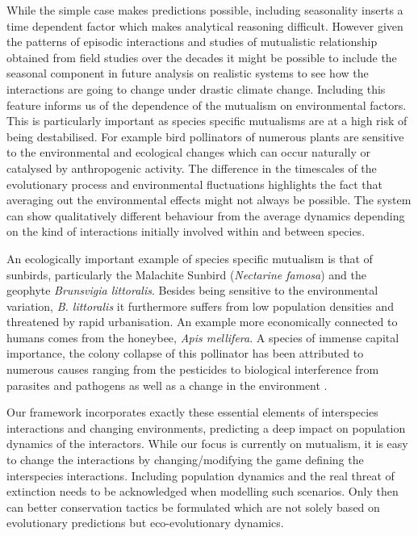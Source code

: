 \documentclass[12pt]{article}
\begin{document}
While the simple case makes predictions possible, including seasonality inserts a time dependent factor which makes analytical reasoning difficult.
However given the patterns of episodic interactions and studies of mutualistic relationship obtained from field studies over the decades it might be possible to include the seasonal component in future analysis on realistic systems to see how the interactions are going to change under drastic climate change.
Including this feature informs us of the dependence of the mutualism on environmental factors.
This is particularly important as species specific mutualisms are at a high risk of being destabilised.
For example bird pollinators of numerous plants are sensitive to the environmental and ecological changes which can occur naturally or catalysed by anthropogenic activity.
The difference in the timescales of the evolutionary process and environmental fluctuations highlights the fact that averaging out the environmental effects might not always be possible.
The system can show qualitatively different behaviour from the average dynamics depending on the kind of interactions initially involved within and between species.


An ecologically important example of species specific mutualism is that of sunbirds, particularly the Malachite Sunbird (\textit{Nectarine famosa}) and the geophyte \textit{Brunsvigia littoralis}.
Besides being sensitive to the environmental variation, \textit{B. littoralis} it furthermore suffers from low population densities \citep{geerts:SAJB:2012} and threatened by rapid urbanisation.
An example more economically connected to humans comes from the honeybee, \textit{Apis mellifera}.
A species of immense capital importance, the colony collapse of this pollinator has been attributed to numerous causes ranging from the pesticides to biological interference from parasites and pathogens as well as a change in the environment \citep{nazzi:PLosPath:2012}.

Our framework incorporates exactly these essential elements of interspecies interactions and changing environments, predicting a deep impact on population dynamics of the interactors.
While our focus is currently on mutualism, it is easy to change the interactions by changing/modifying the game defining the interspecies interactions.
Including population dynamics and the real threat of extinction needs to be acknowledged when modelling such scenarios.
Only then can better conservation tactics be formulated which are not solely based on evolutionary predictions but eco-evolutionary dynamics.
\end{document}
